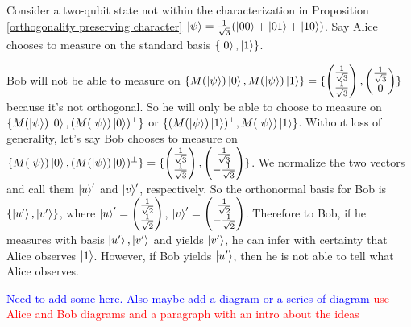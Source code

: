 \begin{example}
Consider a two-qubit state not within the characterization in Proposition \ref{orthogonality preserving character} $\ket{\psi}=\frac{1}{\sqrt{3}}(\ket{00}+\ket{01}+\ket{10})$. Say Alice chooses to measure on the standard basis $\{\ket{0}, \ket{1}\}$.

Bob will not be able to measure on $\{M(\ket{\psi})\ket{0}, M(\ket{\psi})\ket{1}\}=\{\begin{pmatrix}
\frac{1}{\sqrt{3}}\\
\frac{1}{\sqrt{3}}
\end{pmatrix},\begin{pmatrix}
\frac{1}{\sqrt{3}}\\
0
\end{pmatrix}\}$ because it's not orthogonal. So he will only be able to choose to measure on $\{M(\ket{\psi})\ket{0}, (M(\ket{\psi})\ket{0})^\perp \}$ or $\{(M(\ket{\psi})\ket{1})^\perp, M(\ket{\psi})\ket{1} \}$.
Without loss of generality, let's say Bob chooses to measure on $\{M(\ket{\psi})\ket{0}, (M(\ket{\psi})\ket{0})^\perp \}=\{\begin{pmatrix}
\frac{1}{\sqrt{3}}\\
\frac{1}{\sqrt{3}}
\end{pmatrix}, \begin{pmatrix}
\frac{1}{\sqrt{3}}\\
-\frac{1}{\sqrt{3}}
\end{pmatrix}\}$.
We normalize the two vectors and call them $\ket{u}'$ and $\ket{v}'$, respectively. So the orthonormal basis for Bob is $\{\ket{u'}, \ket{v'}\}$, where $\ket{u}'=\begin{pmatrix}
\frac{1}{\sqrt{2}}\\
\frac{1}{\sqrt{2}}
\end{pmatrix}$, $\ket{v}'=\begin{pmatrix}
\frac{1}{\sqrt{2}}\\
-\frac{1}{\sqrt{2}}
\end{pmatrix}$. Therefore to Bob, if he measures with basis $\ket{u'}, \ket{v'}$ and yields $\ket{v'}$, he can infer with certainty that Alice observes $\ket{1}$. However, if Bob yields $\ket{u'}$, then he is not able to tell what Alice observes.
\end{example}
\pagebreak

\textcolor{blue}{Need to add some here.  Also maybe add a diagram or a series of diagram}
\textcolor{red}{use Alice and Bob diagrams and a paragraph with an intro about the ideas}
